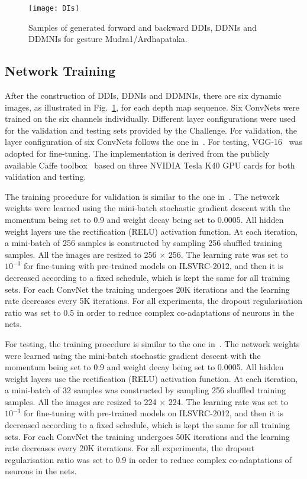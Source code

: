 \documentclass[10pt, a4paper, conference]{IEEEtran}
\begin{document}
\begin{figure}[t]
\begin{center}
{\texttt{[image: DIs]}}
\end{center}
\caption{Samples of generated forward and backward DDIs, DDNIs and DDMNIs for gesture Mudra1/Ardhapataka.}
\label{fig:DIs}
\end{figure}


\subsection{Network Training}
After the construction of DDIs, DDNIs and DDMNIs, there are six dynamic images, as illustrated in Fig.~\ref{fig:DIs}, for each depth map sequence. Six ConvNets were trained on the six channels individually. Different layer configurations were used for the validation and testing sets provided by the Challenge. For validation, the layer configuration of six ConvNets follows the one in~\cite{krizhevsky2012imagenet}.  For testing, VGG-16~\cite{simonyan2014very} was adopted for fine-tuning. The implementation is derived from the publicly available Caffe toolbox~\cite{jia2014caffe} based on three {NVIDIA Tesla K40 GPU} cards for both validation and testing.

The training procedure for validation is similar to the one in~\cite{krizhevsky2012imagenet}. The network weights were learned using the mini-batch stochastic gradient descent with the momentum being set to 0.9 and weight decay being set to 0.0005. All hidden weight layers use the rectification (RELU) activation function. At each iteration, a mini-batch of 256 samples is constructed by sampling 256 shuffled training samples. All the images are resized to 256 $\times$ 256. The learning rate was set to $10^{-3}$ for fine-tuning with pre-trained models on ILSVRC-2012, and then it is decreased according to a fixed schedule, which is kept the same for all training sets. For each ConvNet the training undergoes 20K iterations and the learning rate decreases every 5K iterations. For all experiments, the dropout regularisation ratio was set to 0.5 in order to reduce complex co-adaptations of neurons in the nets.

For testing, the training procedure is similar to the one in~\cite{simonyan2014very}. The network weights were learned using the mini-batch stochastic gradient descent with the momentum being set to 0.9 and weight decay being set to 0.0005. All hidden weight layers use the rectification (RELU) activation function. At each iteration, a mini-batch of 32 samples was constructed by sampling 256 shuffled training samples. All the images are resized to 224 $\times$ 224. The learning rate was set to $10^{-3}$ for fine-tuning with pre-trained models on ILSVRC-2012, and then it is decreased according to a fixed schedule, which is kept the same for all training sets. For each ConvNet the training undergoes 50K iterations and the learning rate decreases every 20K iterations. For all experiments, the dropout regularisation ratio was set to 0.9 in order to reduce complex co-adaptations of neurons in the nets.
\end{document}

